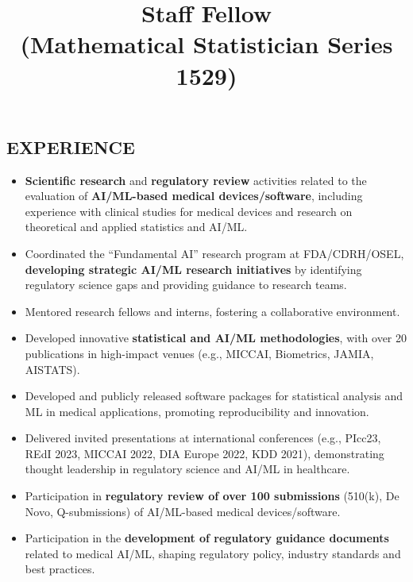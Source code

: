 \documentclass[overlapped, line, 10pt]{res} %
\begin{document}
\begin{resume}
\newpage

\section{EXPERIENCE}

\title{Staff Fellow\\ (Mathematical Statistician Series 1529)}
\begin{position}
  \begin{itemize}
    \item \textbf{Scientific research} and \textbf{regulatory review} activities related to the evaluation of \textbf{AI/ML-based medical devices/software}, including experience with clinical studies for medical devices and research on theoretical and applied statistics and AI/ML.
    \item Coordinated the ``Fundamental AI'' research program at FDA/CDRH/OSEL, \textbf{developing strategic AI/ML research initiatives} by identifying regulatory science gaps and providing guidance to research teams.
    \item Mentored research fellows and interns, fostering a collaborative environment.
    \item Developed innovative \textbf{statistical and AI/ML methodologies}, with over 20 publications in high-impact venues (e.g., MICCAI, Biometrics, JAMIA, AISTATS).
    \item Developed and publicly released software packages for statistical analysis and ML in medical applications, promoting reproducibility and innovation.
    \item Delivered invited presentations at international conferences (e.g., PIcc23, REdI 2023, MICCAI 2022, DIA Europe 2022, KDD 2021), demonstrating thought leadership in regulatory science and AI/ML in healthcare.
    \item Participation in \textbf{regulatory review of over 100 submissions} (510(k), De Novo, Q-submissions) of AI/ML-based medical devices/software.
    \item Participation in the \textbf{development of regulatory guidance documents} related to medical AI/ML, shaping regulatory policy, industry standards and best practices.
  \end{itemize}
\end{position}


\end{resume}
\end{document}
